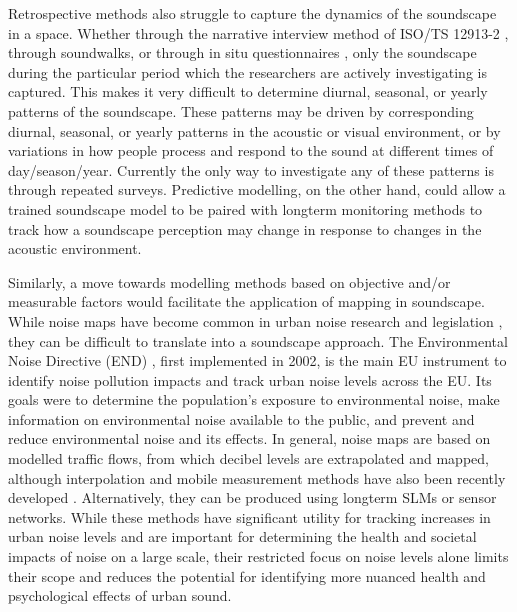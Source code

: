 \documentclass[
  authoryear,
  preprint,
  1p]{elsarticle}
\begin{document}
Retrospective methods also struggle to capture the dynamics of the
soundscape in a space. Whether through the narrative interview method of
ISO/TS 12913-2 \citep{ISO12913Part2}, through soundwalks, or through in
situ questionnaires \citep{Mitchell2020Soundscape}, only the soundscape
during the particular period which the researchers are actively
investigating is captured. This makes it very difficult to determine
diurnal, seasonal, or yearly patterns of the soundscape. These patterns
may be driven by corresponding diurnal, seasonal, or yearly patterns in
the acoustic or visual environment, or by variations in how people
process and respond to the sound at different times of day/season/year.
Currently the only way to investigate any of these patterns is through
repeated surveys. Predictive modelling, on the other hand, could allow a
trained soundscape model to be paired with longterm monitoring methods
to track how a soundscape perception may change in response to changes
in the acoustic environment.

Similarly, a move towards modelling methods based on objective and/or
measurable factors would facilitate the application of mapping in
soundscape. While noise maps have become common in urban noise research
and legislation \citep{EEA2020Environmental, Gasco2020Social}, they can
be difficult to translate into a soundscape approach. The Environmental
Noise Directive (END) \citep{EuropeanUnion2002Directive}, first
implemented in 2002, is the main EU instrument to identify noise
pollution impacts and track urban noise levels across the EU. Its goals
were to determine the population's exposure to environmental noise, make
information on environmental noise available to the public, and prevent
and reduce environmental noise and its effects. In general, noise maps
are based on modelled traffic flows, from which decibel levels are
extrapolated and mapped, although interpolation and mobile measurement
methods have also been recently developed
\citep[see][]{Aumond2018Probabilistic}. Alternatively, they can be
produced using longterm SLMs or sensor networks. While these methods
have significant utility for tracking increases in urban noise levels
and are important for determining the health and societal impacts of
noise on a large scale, their restricted focus on noise levels alone
limits their scope and reduces the potential for identifying more
nuanced health and psychological effects of urban sound.
\end{document}
